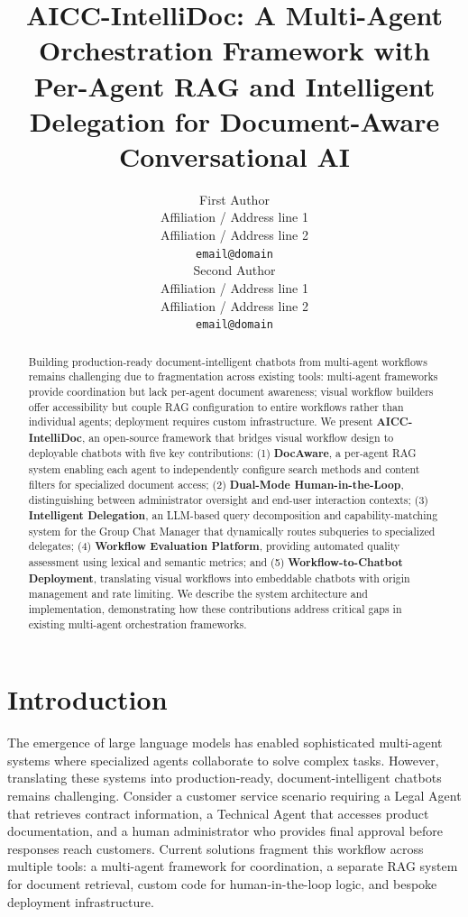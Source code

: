 \documentclass[11pt]{article}
\title{AICC-IntelliDoc: A Multi-Agent Orchestration Framework with\\Per-Agent RAG and Intelligent Delegation for Document-Aware Conversational AI}
\author{First Author \\
  Affiliation / Address line 1 \\
  Affiliation / Address line 2 \\
  \texttt{email@domain} \\\And
  Second Author \\
  Affiliation / Address line 1 \\
  Affiliation / Address line 2 \\
  \texttt{email@domain} \\}
\begin{document}
\maketitle

\begin{abstract}
Building production-ready document-intelligent chatbots from multi-agent workflows remains challenging due to fragmentation across existing tools: multi-agent frameworks provide coordination but lack per-agent document awareness; visual workflow builders offer accessibility but couple RAG configuration to entire workflows rather than individual agents; deployment requires custom infrastructure. We present \textbf{AICC-IntelliDoc}, an open-source framework that bridges visual workflow design to deployable chatbots with five key contributions: (1) \textbf{DocAware}, a per-agent RAG system enabling each agent to independently configure search methods and content filters for specialized document access; (2) \textbf{Dual-Mode Human-in-the-Loop}, distinguishing between administrator oversight and end-user interaction contexts; (3) \textbf{Intelligent Delegation}, an LLM-based query decomposition and capability-matching system for the Group Chat Manager that dynamically routes subqueries to specialized delegates; (4) \textbf{Workflow Evaluation Platform}, providing automated quality assessment using lexical and semantic metrics; and (5) \textbf{Workflow-to-Chatbot Deployment}, translating visual workflows into embeddable chatbots with origin management and rate limiting. We describe the system architecture and implementation, demonstrating how these contributions address critical gaps in existing multi-agent orchestration frameworks.
\end{abstract}

\section{Introduction}

The emergence of large language models has enabled sophisticated multi-agent systems where specialized agents collaborate to solve complex tasks. However, translating these systems into production-ready, document-intelligent chatbots remains challenging. Consider a customer service scenario requiring a Legal Agent that retrieves contract information, a Technical Agent that accesses product documentation, and a human administrator who provides final approval before responses reach customers. Current solutions fragment this workflow across multiple tools: a multi-agent framework for coordination, a separate RAG system for document retrieval, custom code for human-in-the-loop logic, and bespoke deployment infrastructure.
\end{document}
